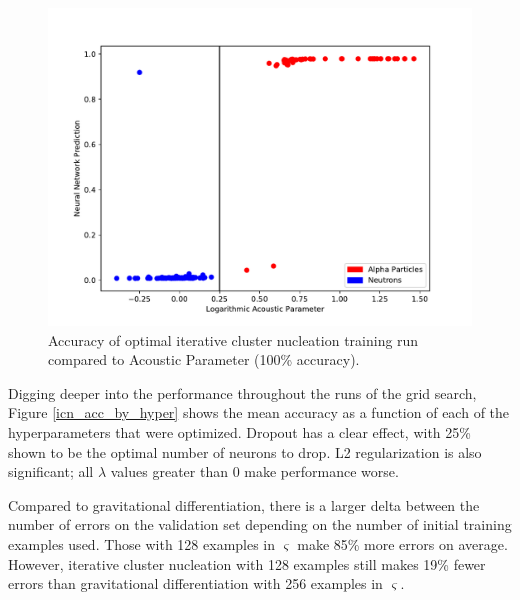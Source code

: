 \documentclass[10pt]{article}
\begin{document}
\begin{figure}[h]
    \centering
    \includegraphics[width=\textwidth]{icn_grid_search}
    \caption{\label{icn_grid_search} Accuracy of optimal iterative cluster nucleation training run compared to Acoustic Parameter (100\% accuracy).}
\end{figure}

Digging deeper into the performance throughout the runs of the grid search, Figure \ref{icn_acc_by_hyper} shows the mean accuracy as a function of each of the hyperparameters that were optimized. Dropout has a clear effect, with 25\% shown to be the optimal number of neurons to drop. L2 regularization is also significant; all $\lambda$ values greater than 0 make performance worse.

Compared to gravitational differentiation, there is a larger delta between the number of errors on the validation set depending on the number of initial training examples used. Those with 128 examples in $\varsigma$ make 85\% more errors on average. However, iterative cluster nucleation with 128 examples still makes 19\% fewer errors than gravitational differentiation with 256 examples in $\varsigma$.
\end{document}
